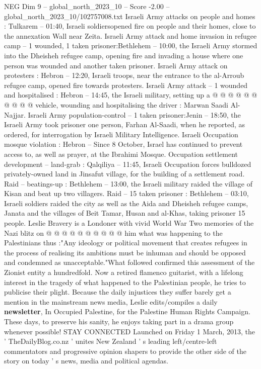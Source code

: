 \begin{textsample}{NEG Dim 9 – global\_north\_2023\_10 – Score -2.00 – global\_north\_2023\_10/102757008.txt}
Israeli Army attacks on people and homes : Tulkarem -- 01:40, Israeli soldiersopened fire on people and their homes, close to the annexation Wall near Zeita.
Israeli Army attack and home invasion in refugee camp -- 1 wounded, 1 taken prisoner:Bethlehem -- 10:00, the Israeli Army stormed into the Dheisheh refugee camp, opening fire and invading a house where one person was wounded and another taken prisoner.
Israeli Army attack on protesters : Hebron -- 12:20, Israeli troops, near the entrance to the al-Arroub refugee camp, opened fire towards protesters.
Israeli Army attack -- 1 wounded and hospitalised : Hebron -- 14:45, the Israeli military, setting up a @ @ @ @ @ @ @ @ @ @ vehicle, wounding and hospitalising the driver : Marwan Saadi Al-Najjar.
Israeli Army population-control -- 1 taken prisoner:Jenin -- 18:50, the Israeli Army took prisoner one person, Farhan Al-Saadi, when he reported, as ordered, for interrogation by Israeli Military Intelligence.
Israeli Occupation mosque violation : Hebron -- Since 8 October, Israel has continued to prevent access to, as well as prayer, at the Ibrahimi Mosque.
Occupation settlement development -- land-grab : Qalqiliya -- 11:45, Israeli Occupation forces bulldozed privately-owned land in Jinsafut village, for the building of a settlement road.
Raid -- beatings-up : Bethlehem -- 13:00, the Israeli military raided the village of Kisan and beat up two villagers.
Raid -- 15 taken prisoner : Bethlehem -- 03:10, Israeli soldiers raided the city as well as the Aida and Dheisheh refugee camps, Janata and the villages of Beit Tamar, Husan and al-Khas, taking prisoner 15 people.
Leslie Bravery is a Londoner with vivid World War Two memories of the Nazi blitz on @ @ @ @ @ @ @ @ @ @ him what was happening to the Palestinians thus :"Any ideology or political movement that creates refugees in the process of realising its ambitions must be inhuman and should be opposed and condemned as unacceptable."What followed confirmed this assessment of the Zionist entity a hundredfold.
Now a retired flamenco guitarist, with a lifelong interest in the tragedy of what happened to the Palestinian people, he tries to publicise their plight.
Because the daily injustices they suffer barely get a mention in the mainstream news media, Leslie edits/compiles a daily \textbf{newsletter}, In Occupied Palestine, for the Palestine Human Rights Campaign.
These days, to preserve his sanity, he enjoys taking part in a drama group whenever possible!
STAY CONNECTED Launched on Friday 1 March, 2013, the ' TheDailyBlog.co.nz ' unites New Zealand ' s leading left/centre-left commentators and progressive opinion shapers to provide the other side of the story on today ' s news, media and political agendas.

\end{textsample}
